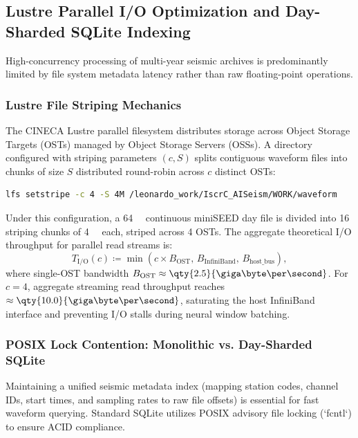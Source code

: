 
\subsection*{Lustre Parallel I/O Optimization and Day-Sharded SQLite Indexing}
\label{subsec:supp_lustre_io}

High-concurrency processing of multi-year seismic archives is
predominantly limited by file system
metadata latency rather than raw floating-point operations.

\subsubsection*{Lustre File Striping Mechanics}
The CINECA Lustre parallel filesystem distributes storage across
Object Storage Targets (OSTs)
managed by Object Storage Servers (OSSs). A directory configured
with striping parameters
$(c, S)$ splits contiguous waveform files into chunks of size $S$
distributed round-robin
across $c$ distinct OSTs:
\begin{lstlisting}[language=bash,basicstyle=\scriptsize\ttfamily]
lfs setstripe -c 4 -S 4M /leonardo_work/IscrC_AISeism/WORK/waveform
\end{lstlisting}
Under this configuration, a \qty{64}{\mega\byte} continuous miniSEED
day file is divided into
\num{16} striping chunks of \qty{4}{\mega\byte} each, striped across
\num{4} OSTs.
The aggregate theoretical I/O throughput for parallel read streams is:
\begin{equation}
  T_{\mathrm{I/O}}(c) \coloneqq \min\left( c \times
    B_{\mathrm{OST}},\, B_{\mathrm{InfiniBand}},\,
  B_{\mathrm{host\_bus}} \right),
  \label{eq:supp_lustre_throughput}
\end{equation}
where single-OST bandwidth $B_{\mathrm{OST}} \approx
\qty{2.5}{\giga\byte\per\second}$.
For $c = \num{4}$, aggregate streaming read throughput reaches
$\approx \qty{10.0}{\giga\byte\per\second}$,
saturating the host InfiniBand interface and preventing I/O stalls
during neural window batching.

\subsubsection*{POSIX Lock Contention: Monolithic vs. Day-Sharded SQLite}
Maintaining a unified seismic metadata index (mapping station codes,
  channel IDs, start times,
and sampling rates to raw file offsets) is essential for fast
waveform querying.
Standard SQLite utilizes POSIX advisory file locking (`fcntl`) to
ensure ACID compliance.


